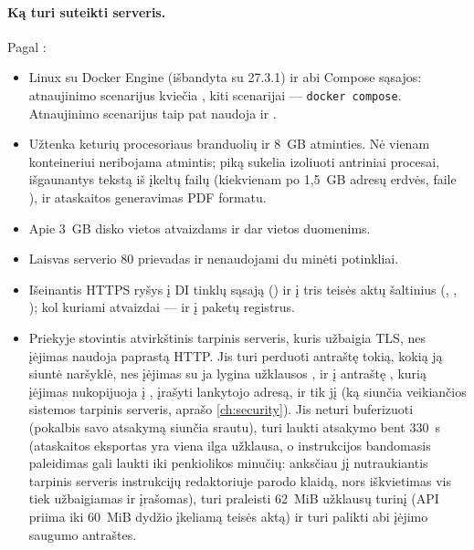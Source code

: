 \paragraph{Ką turi suteikti serveris.} Pagal :
\begin{itemize}
  \item Linux su Docker Engine (išbandyta su 27.3.1) ir abi Compose sąsajos: atnaujinimo
    scenarijus kviečia , kiti scenarijai --- \texttt{docker compose}.
    Atnaujinimo scenarijus taip pat naudoja  ir .
  \item Užtenka keturių procesoriaus branduolių ir 8~GB atminties. Nė vienam konteineriui
    neribojama atmintis; piką sukelia izoliuoti antriniai procesai, išgaunantys tekstą iš įkeltų
    failų (kiekvienam po 1,5~GB adresų erdvės,  faile
    ), ir ataskaitos generavimas PDF formatu.
  \item Apie 3~GB disko vietos atvaizdams ir dar vietos duomenims.
  \item Laisvas serverio 80 prievadas ir nenaudojami du minėti potinkliai.
  \item Išeinantis HTTPS ryšys į DI tinklų sąsają () ir į tris teisės aktų
    šaltinius (, , ); kol kuriami
    atvaizdai --- ir į paketų registrus.
  \item Priekyje stovintis atvirkštinis tarpinis serveris, kuris užbaigia TLS, nes įėjimas naudoja
    paprastą HTTP. Jis turi perduoti antraštę  tokią, kokią ją siuntė naršyklė, nes
    įėjimas su ja lygina užklausos , ir į antraštę , kurią
    įėjimas nukopijuoja į , įrašyti lankytojo adresą, ir tik jį (ką siunčia
    veikiančios sistemos tarpinis serveris, aprašo \cref{ch:security}). Jis neturi buferizuoti
     (pokalbis savo atsakymą siunčia
    srautu), turi laukti atsakymo bent 330~s (ataskaitos eksportas yra viena ilga užklausa, o
    instrukcijos bandomasis paleidimas gali laukti iki penkiolikos minučių: anksčiau jį
    nutraukiantis tarpinis serveris instrukcijų redaktoriuje parodo klaidą, nors iškvietimas vis
    tiek užbaigiamas ir įrašomas), turi praleisti 62~MiB užklausų turinį (API priima iki
    60~MiB dydžio įkeliamą teisės aktą) ir turi palikti abi įėjimo saugumo antraštes.
\end{itemize}

